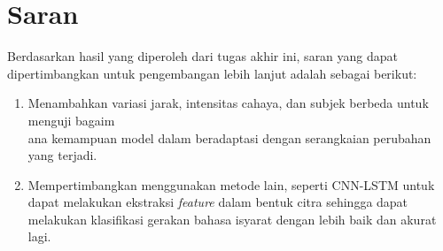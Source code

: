 \section{Saran}
\label{chap:saran}

Berdasarkan hasil yang diperoleh dari tugas akhir ini, saran yang dapat dipertimbangkan untuk pengembangan lebih lanjut adalah sebagai berikut:

\begin{enumerate}[nolistsep]

  \item Menambahkan variasi jarak, intensitas cahaya, dan subjek berbeda untuk menguji bagaim\\ana kemampuan model dalam beradaptasi dengan serangkaian perubahan yang terjadi.
  \item Mempertimbangkan menggunakan metode lain, seperti CNN-LSTM untuk dapat melakukan ekstraksi \emph{feature} dalam bentuk citra sehingga dapat melakukan klasifikasi gerakan bahasa isyarat dengan lebih baik dan akurat lagi.

\end{enumerate}

